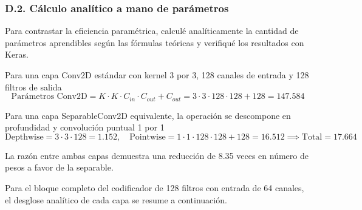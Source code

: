 \documentclass[10pt,letterpaper]{article}
\newcommand{\sangria}{\hspace*{1.5em}}
\begin{document}
\subsubsection*{D.2. Cálculo analítico a mano de parámetros}

\sangria Para contrastar la eficiencia paramétrica, calculé analíticamente la cantidad de parámetros aprendibles según las fórmulas teóricas y verifiqué los resultados con Keras.

Para una capa Conv2D estándar con kernel 3 por 3, 128 canales de entrada y 128 filtros de salida
\[
    \text{Parámetros Conv2D} = K \cdot K \cdot C_{in} \cdot C_{out} + C_{out} = 3 \cdot 3 \cdot 128 \cdot 128 + 128 = 147.584
\]

Para una capa SeparableConv2D equivalente, la operación se descompone en profundidad y convolución puntual 1 por 1
\[
    \text{Depthwise} = 3 \cdot 3 \cdot 128 = 1.152, \quad \text{Pointwise} = 1 \cdot 1 \cdot 128 \cdot 128 + 128 = 16.512 \implies \text{Total} = 17.664
\]

La razón entre ambas capas demuestra una reducción de 8.35 veces en número de pesos a favor de la separable.

Para el bloque completo del codificador de 128 filtros con entrada de 64 canales, el desglose analítico de cada capa se resume a continuación.
\end{document}
